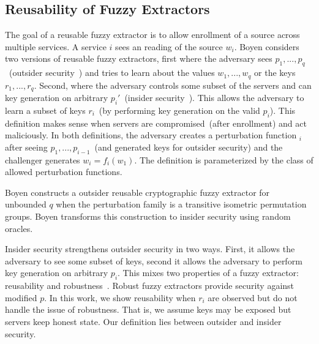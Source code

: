 \documentclass[11pt]{article}
\begin{document}
\subsection{Reusability of Fuzzy Extractors}
\label{sec:comparing reusability}

The goal of a reusable fuzzy extractor is to allow enrollment of a source across multiple services.  A service $i$ sees an reading of the source $w_i$.
Boyen considers two versions of reusable fuzzy extractors, first where the adversary sees $p_1,..., p_q$~(outsider security~\cite[Definition 6]{Boyen2004}) and tries to learn about the values $w_1,..., w_q$ or the keys $r_1,..., r_q$.  Second, where the adversary controls some subset of the servers and can key generation on arbitrary $p_i'$~(insider security~\cite[Definition 7]{Boyen2004}).   This allows the adversary to learn a subset of keys $r_i$~(by performing key generation on the valid $p_i$).  This definition makes sense when servers are compromised~(after enrollment) and act maliciously.  In both definitions, the adversary creates a perturbation function $_i$ after seeing $p_1,..., p_{i-1}$~(and generated keys for outsider security) and the challenger generates $w_i = f_i(w_1)$.  The definition is parameterized by the class of allowed perturbation functions.

Boyen constructs a outsider reusable cryptographic fuzzy extractor for unbounded $q$ when the perturbation family is a transitive isometric permutation groups. Boyen transforms this construction to insider security using random oracles. %

Insider security strengthens outsider security in two ways.  First, it allows the adversary to see some subset of keys, second it allows the adversary to perform key generation on arbitrary $p_i$.  This mixes two properties of a fuzzy extractor:  reusability and robustness~\cite{dkrs2006}.  Robust fuzzy extractors provide security against modified $p$.  
In this work, we show reusability when $r_i$ are observed but do not handle the issue of robustness.  That is, we assume keys may be exposed but servers keep honest state.  Our definition lies between outsider and insider security.
\end{document}
